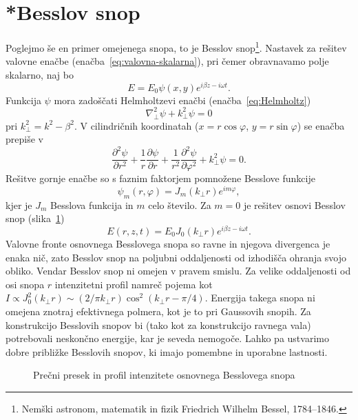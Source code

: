 \section{*Besslov snop}
Poglejmo še en primer omejenega snopa, to je Besslov
snop\footnote{Nemški astronom, matematik in fizik Friedrich Wilhelm Bessel, 1784--1846.}. 
Nastavek za rešitev valovne enačbe (enačba~\ref{eq:valovna-skalarna}), 
pri čemer obravnavamo polje skalarno, naj bo
\begin{equation}
E=E_{0}\psi(x,y)e^{i\beta z-i\omega t}.
\end{equation}
Funkcija $\psi$ mora zadoščati Helmholtzevi enačbi
(enačba~\ref{eq:Helmholtz})
\begin{equation}
\nabla_{\perp}^{2}\psi+k_{\perp}^{2}\psi=0
\end{equation}
pri $k_{\perp}^{2}=k^{2}-\beta^{2}$. V cilindričnih
koordinatah ($x=r\cos\varphi$, $y=r\sin\varphi$) se enačba prepiše v 
\begin{equation}
\frac{\partial^2 \psi}{\partial r^2}+ \frac{1}{r}\frac{\partial \psi}{\partial r}
+ \frac{1}{r^2}\frac{\partial^2 \psi}{\partial \varphi^2}+k_{\perp}^{2}\psi=0.
\end{equation}
Rešitve gornje enačbe so s faznim faktorjem pomnožene Besslove funkcije
\begin{equation}
\psi_m(r, \varphi)=J_{m}(k_{\perp}r)e^{im\varphi},
\end{equation}
kjer je $J_{m}$ Besslova funkcija in $m$ celo število. Za
$m=0$ je rešitev osnovi Besslov snop (slika~\ref{fig:Besslov_presek})
\begin{equation}
E(r,z,t)=E_{0}J_{0}(k_{\perp}r)e^{i\beta z-i \omega t}.
\label{eq:Besslov-snop}
\end{equation}
Valovne fronte osnovnega Besslovega snopa so ravne
 in njegova divergenca je enaka nič, zato Besslov snop na
poljubni oddaljenosti od izhodišča ohranja svojo obliko. Vendar Besslov snop ni 
omejen v pravem smislu. Za velike oddaljenosti od osi snopa $r$ intenzitetni profil 
namreč pojema kot $I \propto J_{0}^{2}(k_{\perp}r)\sim (2/\pi k_{\perp}r)\cos^{2}(k_{\perp}r-\pi/4)$.
Energija takega snopa ni omejena znotraj efektivnega polmera,
kot je to pri Gaussovih snopih. Za konstrukcijo Besslovih snopov
bi (tako kot za konstrukcijo ravnega vala) potrebovali neskončno energije,
kar je seveda nemogoče. Lahko pa ustvarimo dobre približke Besslovih 
snopov, ki imajo pomembne in uporabne lastnosti. 

\begin{figure}[h]
\centering
\def\svgwidth{70truemm} 

\caption{Prečni presek in profil intenzitete osnovnega Besslovega snopa}
\label{fig:Besslov_presek}
\end{figure}

